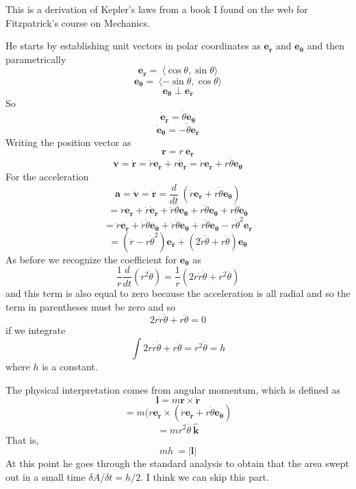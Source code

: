 \documentclass[11pt, oneside]{article}
\begin{document}
This is a derivation of Kepler's laws from a book I found on the web for Fitzpatrick's course on Mechanics.

He starts by establishing unit vectors in polar coordinates as $\mathbf{e_r}$ and $\mathbf{e_{\theta}}$ and then parametrically
\[ \mathbf{e_r} =  \ \langle \cos \theta, \sin \theta \rangle \]
\[ \mathbf{e_{\theta}} =  \ \langle -\sin \theta, \cos \theta \rangle \]
\[ \mathbf{e_{\theta}} \perp \mathbf{e_r} \]
So
\[ \dot{\mathbf{e}}_\mathbf{r} = \dot{\theta} \mathbf{e_{\theta}} \]
\[ \dot{\mathbf{e}}_\mathbf{\theta} = -\dot{\theta} \mathbf{e_{r}} \]
Writing the position vector as
\[ \mathbf{r} = r \ \mathbf{e_r}  \]
\[ \mathbf{v} = \dot{\mathbf{r}} = \dot{r}\mathbf{e_r} + r \dot{\mathbf{e}}_\mathbf{r} =\dot{r}\mathbf{e_r} + r \dot{\theta} \mathbf{e_{\theta}} \]
For the acceleration
\[ \mathbf{a} = \dot{\mathbf{v}} = \ddot{\mathbf{r}} = \frac{d}{dt} \ (\dot{r}\mathbf{e_r} + r \dot{\theta} \mathbf{e_{\theta}}) \]
 \[ = \ddot{r}\mathbf{e_r} + \dot{r}\dot{\mathbf{e}}_\mathbf{r} + \dot{r} \dot{\theta} \mathbf{e_{\theta}} + r \ddot{\theta} \mathbf{e_{\theta}} + r \dot{\theta}  \dot{\mathbf{e}}_\mathbf{\theta}\]
\[ = \ddot{r}\mathbf{e_r} + \dot{r}\dot{\theta} \mathbf{e_{\theta}} + \dot{r} \dot{\theta} \mathbf{e_{\theta}} + r \ddot{\theta} \mathbf{e_{\theta}} - r \dot{\theta}^2  \mathbf{e}_\mathbf{r}\]
\[ = (\ddot{r} - r \dot{\theta}^2)  \mathbf{e}_\mathbf{r} + (2\dot{r} \dot{\theta} + r \ddot{\theta}) \mathbf{e_{\theta}}  \]
As before we recognize the coefficient for $\mathbf{e_{\theta}}$ as
\[ \frac{1}{r} \frac{d}{dt} (r^2\dot{\theta}) = \frac{1}{r}(2r \dot{r} \dot{\theta} + r^2\ddot{\theta})  \]
and this term is also equal to zero because the acceleration is all radial and so the term in parentheses must be zero and so
\[ 2 r \dot{r} \dot{\theta} + r\ddot{\theta} =  0 \]
if we integrate
\[ \int 2 r \dot{r} \dot{\theta} + r\ddot{\theta} = r^2 \dot{\theta} =  h \]
where $h$ is a constant.

The physical interpretation comes from angular momentum, which is defined as
\[ \mathbf{l} = m \mathbf{r} \times \dot{\mathbf{r}} \]
\[ = m (r \mathbf{e}_\mathbf{r} \times (\dot{r}\mathbf{e_r} + r \dot{\theta} \mathbf{e_{\theta}}) \]
\[ = mr^2  \dot{\theta} \ \hat{\mathbf{k}} \]
That is,
\[ mh \ = | \mathbf{l} | \]
At this point he goes through the standard analysis to obtain that the area swept out in a small time $\delta A/\delta t = h/2$.  I think we can skip this part.
\end{document}
